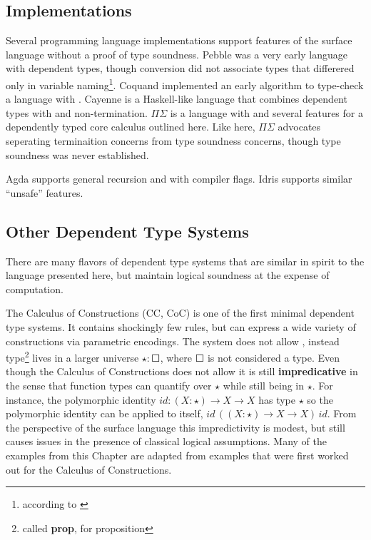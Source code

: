 \subsection{Implementations}

Several programming language implementations support features of the surface language without a proof of type soundness.
Pebble\cite{10.1007/3-540-13346-1_1} was a very early language with dependent types, though conversion did not associate types that differered only in variable naming\footnote{according to \cite{Reinhold89typecheckingis}}.
Coquand implemented an early \bidir{} algorithm to type-check a language with \tit{}\cite{COQUAND1996167}.
Cayenne\cite{10.1145/289423.289451} is a Haskell-like language that combines dependent types with \tit{} and non-termination.
$\Pi$$\Sigma$\cite{10.1007/978-3-642-12251-4_5} is a language with \tit{} and several features for a dependently typed core calculus outlined here.
Like here, $\Pi$$\Sigma$ advocates seperating terminaition concerns from type soundness concerns, though type soundness was never established.

Agda supports general recursion and \tit{} with compiler flags.
Idris supports similar ``unsafe'' features.

\subsection{Other Dependent Type Systems}

There are many flavors of dependent type systems that are similar in spirit to the language presented here, but maintain logical soundness at the expense of computation.

The Calculus of Constructions (\ac{CC}, CoC)\cite{10.1016/0890-5401(88)90005-3} is one of the first minimal dependent type systems.
It contains shockingly few rules, but can express a wide variety of constructions via parametric encodings.
The system does not allow \tit{}, instead type\footnote{called \textbf{prop}, for proposition} lives in a larger universe $\star:\Square$, where $\Square$ is not considered a type.
Even though the Calculus of Constructions does not allow \tit{} it is still \textbf{impredicative} in the sense that function types can quantify over $\star$ while still being in $\star$.
For instance, the polymorphic identity $id:(X:\star)\rightarrow X\rightarrow X$ has type $\star$ so the polymorphic identity can be applied to itself, $id\,\left((X:\star)\rightarrow X\rightarrow X\right)\,id$.
From the perspective of the surface language this impredictivity is modest, but still causes issues in the presence of classical logical assumptions. 
Many of the examples from this Chapter are adapted from examples that were first worked out for the Calculus of Constructions.

